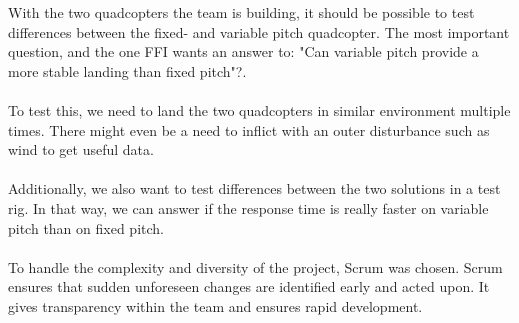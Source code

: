 With the two quadcopters the team is building, it should be possible to test differences between the fixed- and variable pitch quadcopter. The most important question, and the one FFI wants an answer to: "Can variable pitch provide a more stable landing than fixed pitch"?. \\
\\
To test this, we need to land the two quadcopters in similar environment multiple times. There might even be a need to inflict with an outer disturbance such as wind to get useful data. \\
\\
Additionally, we also want to test differences between the two solutions in a test rig. In that way, we can answer if the response time is really faster on variable pitch than on fixed pitch. \\
\\
To handle the complexity and diversity of the project, Scrum was chosen. Scrum ensures that sudden unforeseen changes are identified early and acted upon. It gives transparency within the team and ensures rapid development.















\begin{comment}
\section{Limitations}
In this section you describe the limitations of your study. These may be related to the study object (physical limitations, operational limitations), to the thoroughness of the analysis, and so on.

- Knowledge
- Time
- Complexity
- Stable Flight->
- Autonomous control for reproducibility 
- In depth study of aerodynamics, propellers etc

\section{Approach}
Here you should describe the (scientific) approach that you will use to solve the problem and meet your objectives. You should specify the approach for each objective.

On the quadcopter, most computations will be done on an external computer based on the outputs from the tracking system. On the quadcopter, there will be a device that computes the inner loop that is responsible for the stabilisation.\\
\end{comment}